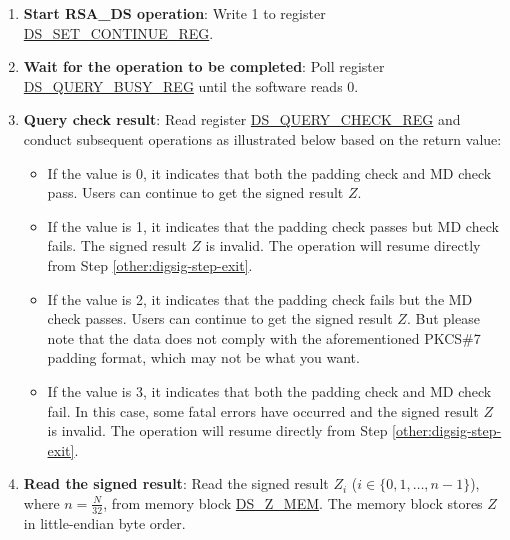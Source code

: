 \documentclass[main\_\_EN.tex]{subfiles}
\begin{document}
\begin{enumerate}
\begin{itemize}
    \end{itemize}


    \item {\bfseries Start RSA\_DS operation}: Write 1 to register \hyperref[regdesc:DSSETCONTINUEREG]{DS\_SET\_CONTINUE\_REG}.
    \item {\bfseries Wait for the operation to be completed}: Poll register \hyperref[regdesc:DSQUERYBUSYREG]{DS\_QUERY\_BUSY\_REG} until the software reads 0.

    \item {\bfseries Query check result}: Read register \hyperref[regdesc:DSQUERYCHECKREG]{DS\_QUERY\_CHECK\_REG} and conduct subsequent operations as illustrated below based on the return value:

    \begin{itemize}

        \item If the value is 0, it indicates that both the padding check and MD check pass. Users can continue to get the signed result \begin{math}Z\end{math}.

        \item If the value is 1, it indicates that the padding check passes but MD check fails. The signed result \begin{math}Z\end{math} is invalid. The operation will resume directly from Step \ref{other:digsig-step-exit}.

        \item If the value is 2, it indicates that the padding check fails but the MD check passes. Users can continue to get the signed result \begin{math}Z\end{math}. But please note that the data does not comply with the aforementioned PKCS\#7 padding format, which may not be what you want.

        \item If the value is 3, it indicates that both the padding check and MD check fail. In this case, some fatal errors have occurred and the signed result \begin{math}Z\end{math} is invalid. The operation will resume directly from Step \ref{other:digsig-step-exit}.

    \end{itemize}

    \item {\bfseries Read the signed result}: Read the signed result \begin{math}Z_{i}\end{math} (\begin{math}i \in \{0,1,\dots,n-1\}\end{math}), where \begin{math} n = \frac{N}{32} \end{math}, from memory block \hyperref[DSZMEM]{DS\_Z\_MEM}. The memory block stores \begin{math}Z\end{math} in little-endian byte order.


\end{enumerate}
\end{document}
